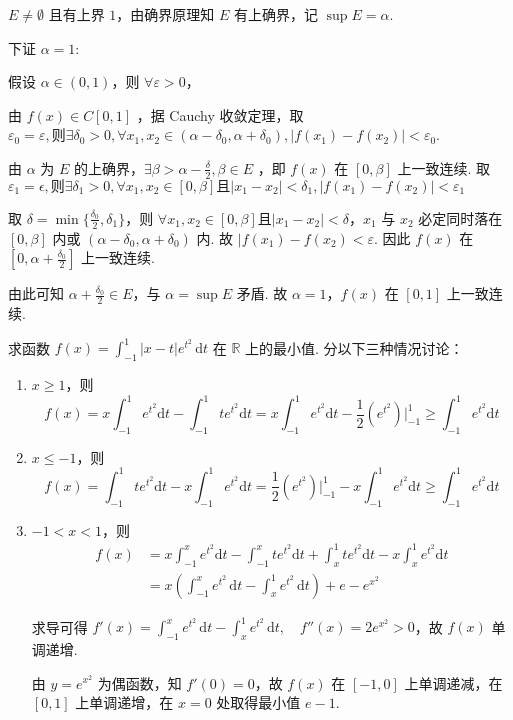 \documentclass{jhwhw}
\begin{document}
    $E\neq\emptyset$ 且有上界 $1$，由确界原理知 $E$ 有上确界，记 $\sup{E}=\alpha$.

    下证 $\alpha=1$:
    
    假设 $\alpha \in (0,1)$，则 $\forall \varepsilon>0$，

    由 $f(x)\in C[0,1]$ ，据 Cauchy 收敛定理，取 $\varepsilon_0=\varepsilon, \text{则} \exists \delta_0>0, \forall x_1,x_2 \in (\alpha-\delta_0,\alpha+\delta_0), |f(x_1)-f(x_2)|<\varepsilon_0$.

    由 $\alpha$ 为 $E$ 的上确界，$\exists \beta>\alpha-\frac{\delta}{2}, \beta\in E$ ，即 $f(x)$ 在 $[0,\beta]$ 上一致连续.
    取 $\varepsilon_1=\epsilon, \text{则} \exists \delta_1>0, \forall x_1,x_2 \in [0,\beta] \text{且} |x_1-x_2|<\delta_1, |f(x_1)-f(x_2)|<\varepsilon_1$

    取 $\delta=\min\{\frac{\delta_0}{2},\delta_1\}$，则 $\forall x_1,x_2 \in [0,\beta] \text{且} |x_1-x_2|<\delta$，$x_1$ 与 $x_2$ 必定同时落在 $[0,\beta]$ 内或 $(\alpha-\delta_0,\alpha+\delta_0)$ 内.
    故 $|f(x_1)-f(x_2)<\varepsilon$. 因此 $f(x)$ 在 $[0,\alpha+\frac{\delta_0}{2}]$ 上一致连续.

    由此可知 $\alpha+\frac{\delta_0}{2} \in E$，与 $\alpha=\sup E$ 矛盾. 故 $\alpha=1$，$f(x)$ 在 $[0,1]$ 上一致连续.

    \newpage
        求函数 $f(x)=\displaystyle\int_{-1}^1 |x-t|e^{t^2} \,\text{d}t$ 在 $\mathbb{R}$ 上的最小值.
    \solution
        分以下三种情况讨论：
        \begin{enumerate}
            \item $x \geq 1$，则
            \[
                f(x) = x\int_{-1}^1 e^{t^2} \text{d}t - \int_{-1}^1 te^{t^2} \text{d}t
                                = x\int_{-1}^1 e^{t^2} \text{d}t - \frac{1}{2} \left(e^{t^2}\right)\Big|_{-1}^1
                                \geq \int_{-1}^1 e^{t^2} \text{d}t
            \]
            \item $x \leq -1$，则
            \[
                f(x) = \int_{-1}^1 te^{t^2} \text{d}t - x\int_{-1}^1 e^{t^2} \text{d}t
                                = \frac{1}{2} \left(e^{t^2}\right)\Big|_{-1}^1 - x\int_{-1}^1 e^{t^2} \text{d}t
                                \geq \int_{-1}^1 e^{t^2} \text{d}t
            \]
            \item $-1<x<1$，则
            \begin{align*}
                f(x) &= x\int_{-1}^x e^{t^2} \text{d}t - \int_{-1}^x te^{t^2} \text{d}t +
                        \int_x^1 te^{t^2} \text{d}t - x\int_x^1 e^{t^2} \text{d}t \\
                     &= x \left(\int_{-1}^x e^{t^2}\,\text{d}t - \int_x^1 e^{t^2}\,\text{d}t \right) + e - e^{x^2}
            \end{align*}
            
            求导可得 $f'(x) = \displaystyle\int_{-1}^x e^{t^2}\,\text{d}t - \displaystyle\int_x^1 e^{t^2}\,\text{d}t,\quad f''(x)=2e^{x^2}>0$，故 $f(x)$ 单调递增.

            由 $y=e^{x^2}$ 为偶函数，知 $f'(0)=0$，故 $f(x)$ 在 $[-1,0]$ 上单调递减，在 $[0,1]$ 上单调递增，在 $x=0$ 处取得最小值 $e-1$.            
        \end{enumerate}
        
\end{document}
